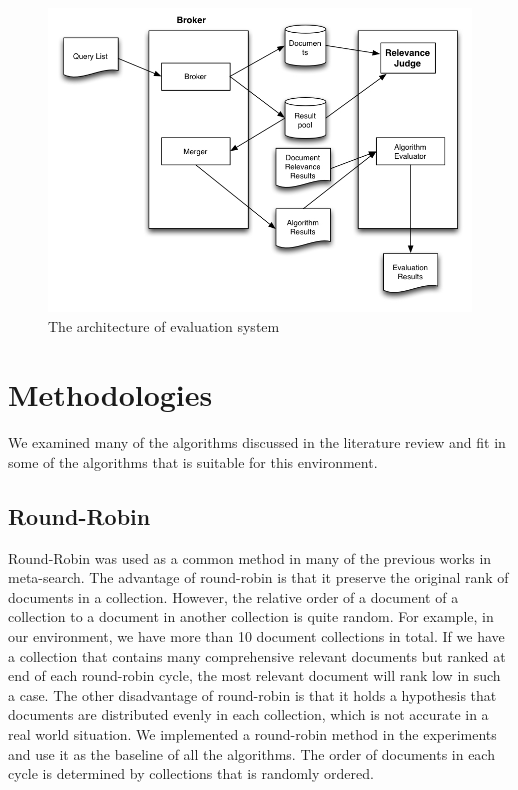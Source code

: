 \begin{figure}
\includegraphics[width=1\textwidth]{eva_arc.jpg}
\caption{The architecture of evaluation system}
\label{fig:eva_arc}
\end{figure}  


\section{Methodologies}
We examined many of the algorithms discussed in the literature review and fit in some of the algorithms that is suitable for this environment.
\subsection{Round-Robin}
Round-Robin was used as a common method in many of the previous works in meta-search. The advantage   of round-robin is that it preserve the original rank of documents in a collection. However, the relative order of a document of a collection to a document in another collection is quite random. For example, in our environment, we have more than 10 document collections in total. If we have a collection that contains many comprehensive relevant documents but ranked at end of each round-robin cycle, the most relevant document will rank low in such a case. The other disadvantage of round-robin is that it holds a hypothesis that documents are distributed evenly in each collection, which is not accurate in a real world situation. We implemented a round-robin method in the experiments and use it as the baseline of all the algorithms. The order of documents in each cycle is determined by collections that is randomly ordered.
